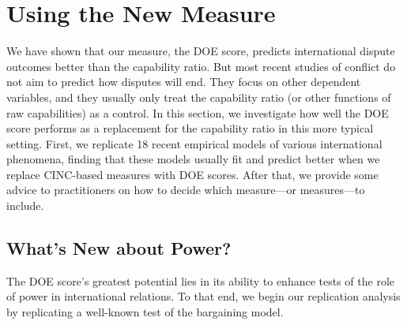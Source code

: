 
\section{Using the New Measure}
\label{sec:replications}


We have shown that our measure, the DOE score, predicts international dispute outcomes better than the capability ratio.
But most recent studies of conflict do not aim to predict how disputes will end.
They focus on other dependent variables, and they usually only treat the capability ratio (or other functions of raw capabilities) as a control.
In this section, we investigate how well the DOE score performs as a replacement for the capability ratio in this more typical setting.
First, we replicate 18 recent empirical models of various international phenomena, finding that these models usually fit and predict better when we replace CINC-based measures with DOE scores.
After that, we provide some advice to practitioners on how to decide which measure---or measures---to include.

\subsection{What's New about Power?}

The DOE score's greatest potential lies in its ability to enhance tests of the role of power in international relations.
To that end, we begin our replication analysis by replicating a well-known test of the bargaining model.


